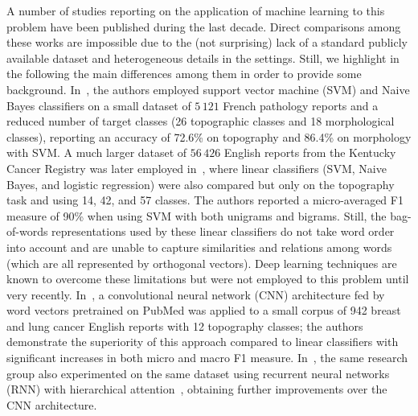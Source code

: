 A number of studies reporting on the application of machine learning
to this problem have been published during the last decade. Direct
comparisons among these works are impossible due to the (not
surprising) lack of a standard publicly available dataset and
heterogeneous details in the settings. Still, we highlight in the
following the main differences among them in order to provide some
background. In~\cite{jouhet_automated_2011}, the authors employed
support vector machine (SVM) and Naive Bayes classifiers on a small
dataset of $5\,121$ French pathology reports and a reduced number of
target classes (26 topographic classes and 18 morphological classes),
reporting an accuracy of 72.6\% on topography and 86.4\% on morphology
with SVM. A much larger dataset of $56\,426$ English reports from the
Kentucky Cancer Registry was later employed
in~\cite{kavuluru_automatic_2013}, where linear classifiers (SVM,
Naive Bayes, and logistic regression) were also compared but only on
the topography task and using 14, 42, and 57 classes. The authors
reported a micro-averaged F1 measure of 90\% when using SVM with both
unigrams and bigrams. Still, the bag-of-words representations used by
these linear classifiers do not take word order into account and are
unable to capture similarities and relations among words (which are
all represented by orthogonal vectors). Deep learning techniques are
known to overcome these limitations but were not employed to this
problem until very recently. In~\cite{qiu_deep_2018}, a convolutional
neural network (CNN) architecture fed by word vectors pretrained on
PubMed was applied to a small corpus of 942 breast and lung cancer
English reports with 12 topography classes; the authors demonstrate
the superiority of this approach compared to linear classifiers with
significant increases in both micro and macro F1
measure. In~\cite{gao_hierarchical_2018}, the same research group also
experimented on the same dataset using recurrent neural networks (RNN)
with hierarchical attention~\cite{yang_hierarchical_2016}, obtaining
further improvements over the CNN architecture.

